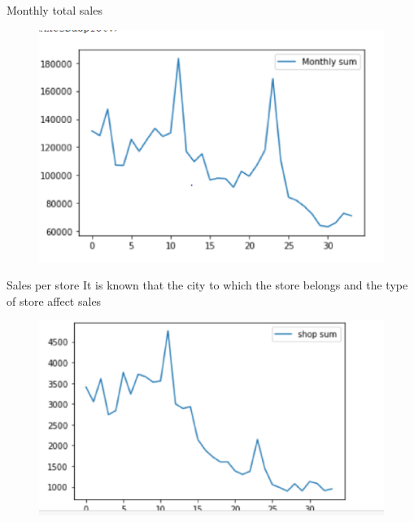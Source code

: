 \documentclass[
 size=14pt,
 paper=smartboard,  %
 mode=present, 		%
 display=slides, 	%
 style=tuliplab,  	%
 pauseslide,
 fleqn,leqno]{powerdot}
\begin{document}
\begin{slide}[toc=,bm=]{Monthly total sales}
 
  \begin{figure}
    \includegraphics[scale=0.5]{picture/data_18.eps}
  \end{figure}
\end{slide}

\begin{slide}[toc=,bm=]{Sales per store}
  It is known that the city to which the store belongs and the type of store affect sales
  \begin{figure}
    \includegraphics[scale=0.5]{picture/data_19.eps}
  \end{figure}
\end{slide}
\end{document}
